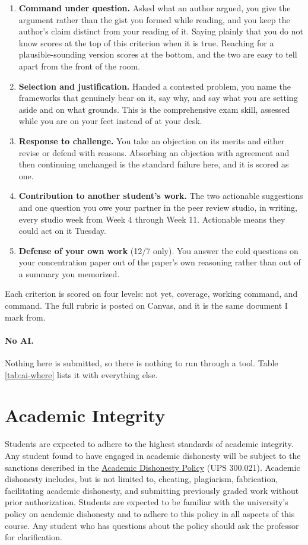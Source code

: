 \documentclass[11pt]{article}     %
\begin{document}
\begin{enumerate}
    \item \textbf{Command under question.} Asked what an author argued, you give the argument rather than the gist you formed while reading, and you keep the author's claim distinct from your reading of it. Saying plainly that you do not know scores at the top of this criterion when it is true. Reaching for a plausible-sounding version scores at the bottom, and the two are easy to tell apart from the front of the room.
    \item \textbf{Selection and justification.} Handed a contested problem, you name the frameworks that genuinely bear on it, say why, and say what you are setting aside and on what grounds. This is the comprehensive exam skill, assessed while you are on your feet instead of at your desk.
    \item \textbf{Response to challenge.} You take an objection on its merits and either revise or defend with reasons. Absorbing an objection with agreement and then continuing unchanged is the standard failure here, and it is scored as one.
    \item \textbf{Contribution to another student's work.} The two actionable suggestions and one question you owe your partner in the peer review studio, in writing, every studio week from Week 4 through Week 11. Actionable means they could act on it Tuesday.
    \item \textbf{Defense of your own work} (12/7 only). You answer the cold questions on your concentration paper out of the paper's own reasoning rather than out of a summary you memorized.
\end{enumerate}

\noindent Each criterion is scored on four levels: not yet, coverage, working command, and command. The full rubric is posted on Canvas, and it is the same document I mark from.

\paragraph*{No AI.} Nothing here is submitted, so there is nothing to run through a tool. Table \ref{tab:ai-where} lists it with everything else.

\section*{Academic Integrity}
Students are expected to adhere to the highest standards of academic integrity. Any student found to have engaged in academic dishonesty will be subject to the sanctions described in the \href{https://www.fullerton.edu/senate/publications_policies_resolutions/ups/UPS%20300/UPS%20300.021.pdf}{Academic Dishonesty Policy} (UPS 300.021). Academic dishonesty includes, but is not limited to, cheating, plagiarism, fabrication, facilitating academic dishonesty, and submitting previously graded work without prior authorization. Students are expected to be familiar with the university's policy on academic dishonesty and to adhere to this policy in all aspects of this course. Any student who has questions about the policy should ask the professor for clarification.
\end{document}
